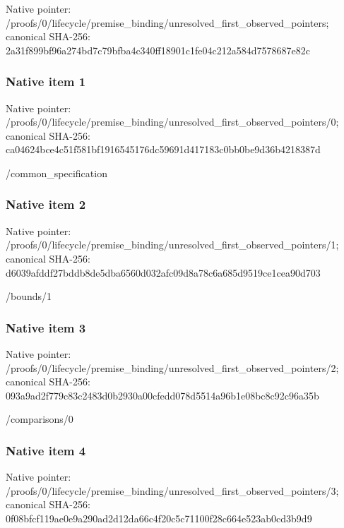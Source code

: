 \documentclass[10pt,a4paper]{article}
\begin{document}
Native pointer: /proofs/0/lifecycle/prem\allowbreak{}ise\_binding/unresolved\_f\allowbreak{}irst\_observed\_pointers; canonical SHA-256: 2a31f899bf96a274bd7c79bf\allowbreak{}ba4c340ff18901c1fe04c212\allowbreak{}a584d7578687e82c



\subsubsection{Native item 1}


Native pointer: /proofs/0/lifecycle/prem\allowbreak{}ise\_binding/unresolved\_f\allowbreak{}irst\_observed\_pointers/0; canonical SHA-256: ca04624bce4c51f581bf1916\allowbreak{}545176dc59691d417183c0bb\allowbreak{}0be9d36b4218387d


/common\_specification


\subsubsection{Native item 2}


Native pointer: /proofs/0/lifecycle/prem\allowbreak{}ise\_binding/unresolved\_f\allowbreak{}irst\_observed\_pointers/1; canonical SHA-256: d6039afddf27bddb8de5dba6\allowbreak{}560d032afc09d8a78c6a685d\allowbreak{}9519ce1cea90d703


/bounds/1


\subsubsection{Native item 3}


Native pointer: /proofs/0/lifecycle/prem\allowbreak{}ise\_binding/unresolved\_f\allowbreak{}irst\_observed\_pointers/2; canonical SHA-256: 093a9ad2f779c83c2483d0b2\allowbreak{}930a00cfedd078d5514a96b1\allowbreak{}e08bc8c92c96a35b


/comparisons/0


\subsubsection{Native item 4}


Native pointer: /proofs/0/lifecycle/prem\allowbreak{}ise\_binding/unresolved\_f\allowbreak{}irst\_observed\_pointers/3; canonical SHA-256: 0f08bfcf119ae0e9a290ad2d\allowbreak{}12da66c4f20c5c71100f28c6\allowbreak{}64e523ab0cd3b9d9
\end{document}
